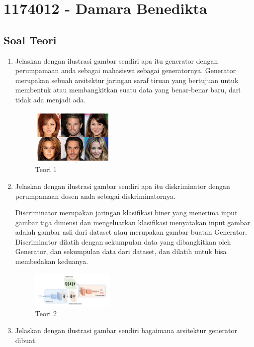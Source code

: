 \section{1174012 - Damara Benedikta}
\subsection{Soal Teori}
\begin{enumerate}

	\item Jelaskan dengan ilustrasi gambar sendiri apa itu generator dengan perumpamaan anda sebagai mahasiswa sebagai generatornya.
	\hfill\break
    Generator merupakan sebuah 
    arsitektur jaringan saraf tiruan yang
    bertujuan untuk membentuk atau 
    membangkitkan suatu data yang benar-benar baru,
    dari tidak ada menjadi ada.

	\begin{figure}[H]
	\centering
		\includegraphics[width=4cm]{figures/1174012/chapter8/T1.PNG}
		\caption{Teori 1}
	\end{figure}

	\item Jelaskan dengan ilustrasi gambar sendiri apa itu diskriminator dengan perumpamaan dosen anda sebagai diskriminatornya.

	\hfill\break
	Discriminator merupakan jaringan klasifikasi 
    biner yang menerima input gambar tiga dimensi dan 
    mengeluarkan klasifikasi menyatakan input gambar 
    adalah gambar asli dari dataset atau merupakan 
    gambar buatan Generator. Discriminator dilatih 
    dengan sekumpulan data yang dibangkitkan oleh 
    Generator, dan sekumpulan data dari dataset, 
    dan dilatih untuk bisa membedakan keduanya.
	\begin{figure}[H]
	\centering
		\includegraphics[width=4cm]{figures/1174012/chapter8/T2.PNG}
		\caption{Teori 2}
	\end{figure}
	
	\item Jelaskan dengan ilustrasi gambar sendiri bagaimana arsitektur generator dibuat.


\end{enumerate}
